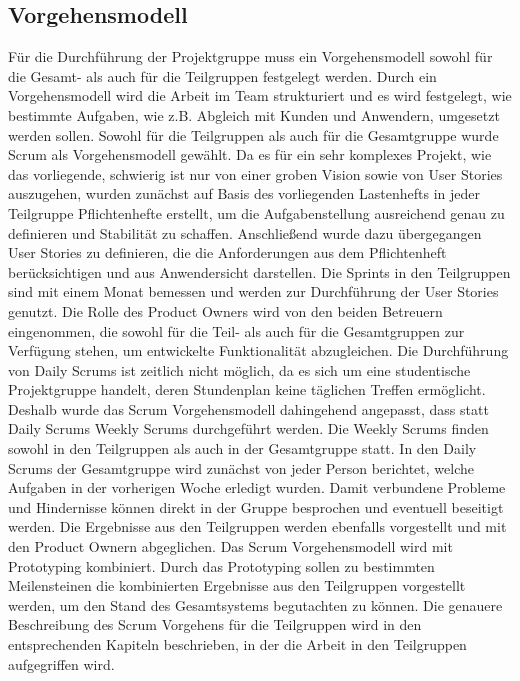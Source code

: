 \subsection{Vorgehensmodell}
Für die Durchführung der Projektgruppe muss ein Vorgehensmodell sowohl für die Gesamt- als auch für die Teilgruppen festgelegt werden. Durch ein Vorgehensmodell wird die Arbeit im Team strukturiert und es wird festgelegt, wie bestimmte Aufgaben, wie z.B. Abgleich mit Kunden und Anwendern, umgesetzt werden sollen. Sowohl für die Teilgruppen als auch für die Gesamtgruppe wurde Scrum als Vorgehensmodell gewählt. Da es für ein sehr komplexes Projekt, wie das vorliegende, schwierig ist nur von einer groben Vision sowie von User Stories auszugehen, wurden zunächst auf Basis des vorliegenden Lastenhefts in jeder Teilgruppe Pflichtenhefte erstellt, um die Aufgabenstellung ausreichend genau zu definieren und Stabilität zu schaffen. Anschließend wurde dazu übergegangen User Stories zu definieren, die die Anforderungen aus dem Pflichtenheft berücksichtigen und aus Anwendersicht darstellen. Die Sprints in den Teilgruppen sind mit einem Monat bemessen und werden zur Durchführung der User Stories genutzt. Die Rolle des Product Owners wird von den beiden Betreuern eingenommen, die sowohl für die Teil- als auch für die Gesamtgruppen zur Verfügung stehen, um entwickelte Funktionalität abzugleichen. Die Durchführung von Daily Scrums ist zeitlich nicht möglich, da es sich um eine studentische Projektgruppe handelt, deren Stundenplan keine täglichen Treffen ermöglicht. Deshalb wurde das Scrum Vorgehensmodell dahingehend angepasst, dass statt Daily Scrums Weekly Scrums durchgeführt werden. Die Weekly Scrums finden sowohl in den Teilgruppen als auch in der Gesamtgruppe statt. In den Daily Scrums der Gesamtgruppe wird zunächst von jeder Person berichtet, welche Aufgaben in der vorherigen Woche erledigt wurden. Damit verbundene Probleme und Hindernisse können direkt in der Gruppe besprochen und eventuell beseitigt werden. Die Ergebnisse aus den Teilgruppen werden ebenfalls vorgestellt und mit den Product Ownern abgeglichen. Das Scrum Vorgehensmodell wird mit  Prototyping kombiniert. Durch das Prototyping sollen zu bestimmten Meilensteinen die kombinierten Ergebnisse aus den Teilgruppen vorgestellt werden, um den Stand des Gesamtsystems begutachten zu können. Die genauere Beschreibung des Scrum Vorgehens für die Teilgruppen wird in den entsprechenden Kapiteln beschrieben, in der die Arbeit in den Teilgruppen aufgegriffen wird.   